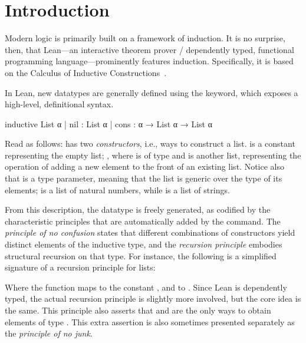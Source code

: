 \chapter{Introduction}%
\label{ch:intro}


Modern logic is primarily built on a framework of induction.
It is no surprise, then, that Lean---an interactive theorem prover / dependently typed, functional programming language---prominently features induction.
Specifically, it is based on the Calculus of Inductive Constructions~\cite{avigadTheoremProvingLean}.

In Lean, new datatypes are generally defined using the \inductive{} keyword, which exposes a high-level, definitional syntax.

\begin{leancode}
  inductive List α 
    | nil  : List α
    | cons : α → List α → List α
\end{leancode}

Read as follows:  has two \emph{constructors}, i.e., ways to construct a list.
 is a constant
representing the empty list; 
, where  is of type  and  is another list, representing the operation of adding a new element to the front of an existing list. Notice also that  is a type parameter, meaning that the list is generic over the type of its elements;  is a list of natural numbers, while  is a list of strings.

From this description, the datatype is freely generated, as codified by the characteristic principles that are automatically added by the \inductive{} command.
The \emph{principle of no confusion} states that different combinations of constructors yield distinct elements of the inductive type, and the \emph{recursion principle} embodies structural recursion on that type. For instance, the following is a simplified signature of a recursion principle for lists:
\begin{center}
\end{center}
Where the function  maps  to the constant , and  to . Since Lean is dependently typed, the actual recursion principle is slightly more involved, but the core idea is the same.
This principle also asserts that  and  are the only ways to obtain elements of type . This extra assertion is also sometimes presented separately as the \emph{principle of no junk}.


